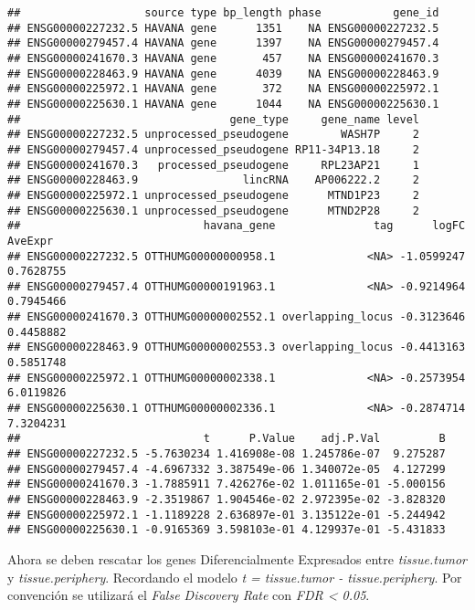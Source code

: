 \documentclass[
]{article}
\newenvironment{Shaded}{\begin{snugshade}}{\end{snugshade}}
\newcommand{\CommentTok}[1]{\textcolor[rgb]{0.56,0.35,0.01}{\textit{#1}}}
\newcommand{\FloatTok}[1]{\textcolor[rgb]{0.00,0.00,0.81}{#1}}
\newcommand{\FunctionTok}[1]{\textcolor[rgb]{0.00,0.00,0.00}{#1}}
\newcommand{\NormalTok}[1]{#1}
\newcommand{\SpecialCharTok}[1]{\textcolor[rgb]{0.00,0.00,0.00}{#1}}
\begin{document}
\begin{verbatim}
##                   source type bp_length phase           gene_id
## ENSG00000227232.5 HAVANA gene      1351    NA ENSG00000227232.5
## ENSG00000279457.4 HAVANA gene      1397    NA ENSG00000279457.4
## ENSG00000241670.3 HAVANA gene       457    NA ENSG00000241670.3
## ENSG00000228463.9 HAVANA gene      4039    NA ENSG00000228463.9
## ENSG00000225972.1 HAVANA gene       372    NA ENSG00000225972.1
## ENSG00000225630.1 HAVANA gene      1044    NA ENSG00000225630.1
##                                gene_type     gene_name level
## ENSG00000227232.5 unprocessed_pseudogene        WASH7P     2
## ENSG00000279457.4 unprocessed_pseudogene RP11-34P13.18     2
## ENSG00000241670.3   processed_pseudogene     RPL23AP21     1
## ENSG00000228463.9                lincRNA    AP006222.2     2
## ENSG00000225972.1 unprocessed_pseudogene      MTND1P23     2
## ENSG00000225630.1 unprocessed_pseudogene      MTND2P28     2
##                            havana_gene               tag      logFC   AveExpr
## ENSG00000227232.5 OTTHUMG00000000958.1              <NA> -1.0599247 0.7628755
## ENSG00000279457.4 OTTHUMG00000191963.1              <NA> -0.9214964 0.7945466
## ENSG00000241670.3 OTTHUMG00000002552.1 overlapping_locus -0.3123646 0.4458882
## ENSG00000228463.9 OTTHUMG00000002553.3 overlapping_locus -0.4413163 0.5851748
## ENSG00000225972.1 OTTHUMG00000002338.1              <NA> -0.2573954 6.0119826
## ENSG00000225630.1 OTTHUMG00000002336.1              <NA> -0.2874714 7.3204231
##                            t      P.Value    adj.P.Val         B
## ENSG00000227232.5 -5.7630234 1.416908e-08 1.245786e-07  9.275287
## ENSG00000279457.4 -4.6967332 3.387549e-06 1.340072e-05  4.127299
## ENSG00000241670.3 -1.7885911 7.426276e-02 1.011165e-01 -5.000156
## ENSG00000228463.9 -2.3519867 1.904546e-02 2.972395e-02 -3.828320
## ENSG00000225972.1 -1.1189228 2.636897e-01 3.135122e-01 -5.244942
## ENSG00000225630.1 -0.9165369 3.598103e-01 4.129937e-01 -5.431833
\end{verbatim}

Ahora se deben rescatar los genes Diferencialmente Expresados entre
\emph{tissue.tumor} y \emph{tissue.periphery}. Recordando el modelo
\emph{t = tissue.tumor - tissue.periphery}. Por convención se utilizará
el \emph{False Discovery Rate} con \emph{FDR \textless{} 0.05}.

\begin{Shaded}
\end{Shaded}
\end{document}
